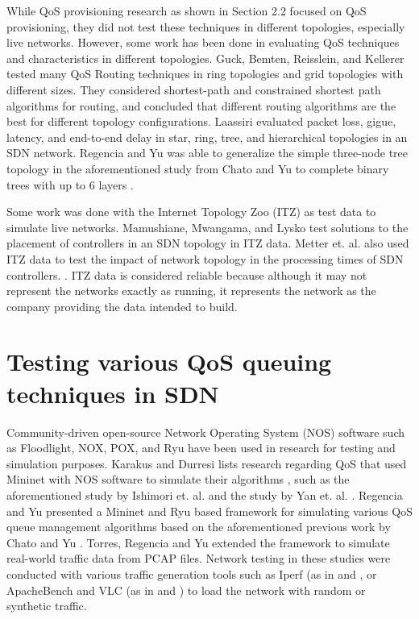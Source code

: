 While QoS provisioning research as shown in Section 2.2 focused on QoS provisioning, they did not test these techniques in different topologies, especially live networks. However, some work has been done in evaluating QoS techniques and characteristics in different topologies. Guck, Bemten, Reisslein, and Kellerer \cite{guck_unicast_2018} tested many QoS Routing techniques in ring topologies and grid topologies with different sizes. They considered shortest-path and constrained shortest path algorithms for routing, and concluded that different routing algorithms are the best for different topology configurations. Laassiri \cite{laassiri_evaluation_2017} evaluated packet loss, gigue, latency, and end-to-end delay in star, ring, tree, and hierarchical topologies in an SDN network. Regencia and Yu was able to generalize the simple three-node tree topology in the aforementioned study from Chato and Yu to complete binary trees with up to 6 layers \cite{yang_introducing_2022}.

Some work was done with the Internet Topology Zoo (ITZ) as test data to simulate live networks. Mamushiane, Mwangama, and Lysko \cite{mamushiane_given_2018} test solutions to the placement of controllers in an SDN topology in ITZ data. Metter et. al. also used ITZ data to test the impact of network topology in the processing times of SDN controllers. \cite{metter_investigating_2015}. ITZ data is considered reliable because although it may not represent the networks exactly as running, it represents the network as the company providing the data intended to build. \cite{knight_internet_2011}

\section{Testing various QoS queuing techniques in SDN}
Community-driven open-source Network Operating System (NOS) software such as Floodlight, NOX, POX, and Ryu have been used in research for testing and simulation purposes. Karakus and Durresi lists research regarding QoS that used Mininet with NOS software to simulate their algorithms \cite{karakus_quality_2017}, such as the aforementioned study by Ishimori et. al. \cite{ishimori_control_2013} and the study by Yan et. al. \cite{yan_hiqos_2015}. Regencia and Yu \cite{yang_introducing_2022} presented a Mininet and Ryu based framework for simulating various QoS queue management algorithms based on the aforementioned previous work by Chato and Yu \cite{chato_exploration_2016}. Torres, Regencia and Yu \cite{kim_real_2021} extended the framework to simulate real-world traffic data from PCAP files. Network testing in these studies were conducted with various traffic generation tools such as Iperf (as in \cite{yan_hiqos_2015} and \cite{ishimori_control_2013}, or ApacheBench and VLC (as in \cite{chato_exploration_2016} and \cite{kim_real_2021}) to load the network with random or synthetic traffic.

